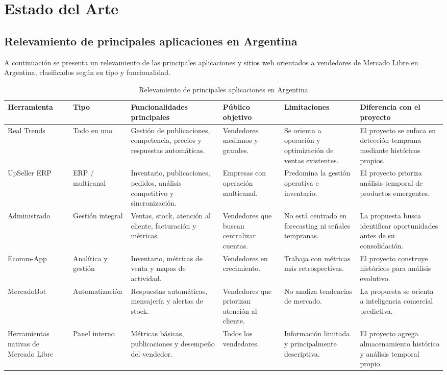 \section{Estado del Arte}\label{chapter02}

\subsection{Relevamiento de principales aplicaciones en Argentina}

A continuación se presenta un relevamiento de las principales aplicaciones y sitios web orientados a vendedores de Mercado Libre en Argentina, clasificados según su tipo y funcionalidad.

\begin{table}[ht]
	\centering
	\caption{Relevamiento de principales aplicaciones en Argentina}
	\label{tab:relevamiento}
	\small
	\begin{tabularx}{\textwidth}{@{}>{\raggedright\arraybackslash}p{1.8cm} >{\raggedright\arraybackslash}p{1.9cm} >{\raggedright\arraybackslash}p{2.3cm} >{\raggedright\arraybackslash}p{1.7cm} >{\raggedright\arraybackslash}p{2.1cm} X@{}}
		\toprule
		\textbf{Herramienta} & \textbf{Tipo} & \textbf{Funcionalidades principales} & \textbf{Público objetivo} & \textbf{Limitaciones} & \textbf{Diferencia con el proyecto} \\
		\midrule
		Real Trends & Todo en uno & Gestión de publicaciones, competencia, precios y respuestas automáticas. & Vendedores medianos y grandes. & Se orienta a operación y optimización de ventas existentes. & El proyecto se enfoca en detección temprana mediante históricos propios. \\
		UpSeller ERP & ERP / multicanal & Inventario, publicaciones, pedidos, análisis competitivo y sincronización. & Empresas con operación multicanal. & Predomina la gestión operativa e inventario. & El proyecto prioriza análisis temporal de productos emergentes. \\
		Administrado & Gestión integral & Ventas, stock, atención al cliente, facturación y métricas. & Vendedores que buscan centralizar cuentas. & No está centrado en forecasting ni señales tempranas. & La propuesta busca identificar oportunidades antes de su consolidación. \\
		Ecomm-App & Analítica y gestión & Inventario, métricas de venta y mapas de actividad. & Vendedores en crecimiento. & Trabaja con métricas más retrospectivas. & El proyecto construye históricos para análisis evolutivo. \\
		MercadoBot & Automatización & Respuestas automáticas, mensajería y alertas de stock. & Vendedores que priorizan atención al cliente. & No analiza tendencias de mercado. & La propuesta se orienta a inteligencia comercial predictiva. \\
		Herramientas nativas de Mercado Libre & Panel interno & Métricas básicas, publicaciones y desempeño del vendedor. & Todos los vendedores. & Información limitada y principalmente descriptiva. & El proyecto agrega almacenamiento histórico y análisis temporal propio. \\
		\bottomrule
	\end{tabularx}
\end{table}

